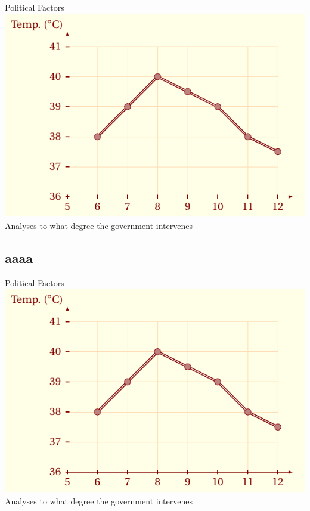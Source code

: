 \documentclass{article}
\begin{document}
\begin{mybox}{Political Factors}
    \includegraphics[scale=.3]{pdf/cal_fun1.pdf}
    \tcblower
    Analyses to what degree the government intervenes
\end{mybox}
\subsection{aaaa}
\begin{mybox}{Political Factors}
    \includegraphics[scale=.3]{pdf/cal_fun1.pdf}
    \tcblower
    Analyses to what degree the government intervenes
\end{mybox}
\lipsum[1]
\end{document}

